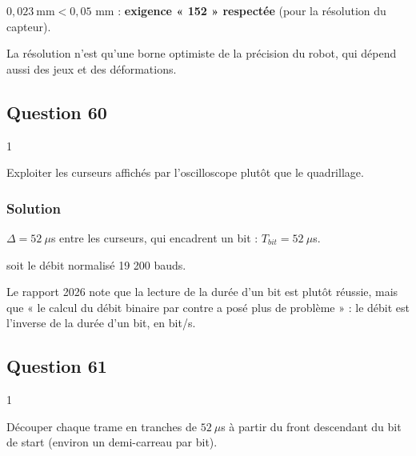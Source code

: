 \documentclass[11pt,a4paper]{article}
\newcommand{\equationajustee}[1]{%
  \sbox{\boiteequation}{$\displaystyle #1$}%
  \ifdim\wd\boiteequation>\linewidth
    \[\resizebox{\linewidth}{!}{\usebox{\boiteequation}}\]%
  \else
    \[#1\]%
  \fi}
\begin{document}
\(0{,}023\ \text{mm}<0{,}05\) mm : \textbf{exigence « 152 » respectée} (pour la résolution du capteur).

\begin{piege}

La résolution n'est qu'une borne optimiste de la précision du robot, qui dépend aussi des jeux et des déformations.

\end{piege}

\hypertarget{question-60}{%
\subsection{Question 60}\label{question-60}}

\begin{indication}{1}

Exploiter les curseurs affichés par l'oscilloscope plutôt que le quadrillage.

\end{indication}

\hypertarget{solution-59}{%
\subsubsection{Solution}\label{solution-59}}

\(\Delta=52\ \mu\)s entre les curseurs, qui encadrent un bit : \(T_{bit}=52\ \mu\)s.

\equationajustee{\boxed{D=1/T_{bit}\simeq19\,230\ \text{bit/s}}}

soit le débit normalisé 19 200 bauds.

\begin{jury}

Le rapport 2026 note que la lecture de la durée d'un bit est plutôt réussie, mais que « le calcul du débit binaire par contre a posé plus de problème » : le débit est l'inverse de la durée d'un bit, en bit/s.

\end{jury}

\hypertarget{question-61}{%
\subsection{Question 61}\label{question-61}}

\begin{indication}{1}

Découper chaque trame en tranches de \(52\ \mu\)s à partir du front descendant du bit de start (environ un demi-carreau par bit).

\end{indication}
\end{document}
